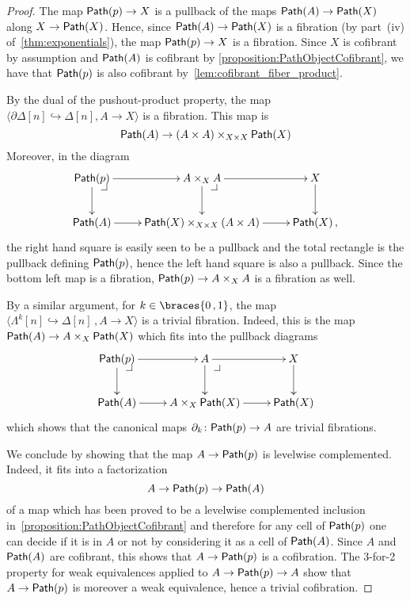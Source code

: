 \documentclass[reqno,10pt,a4paper,oneside,draft]{amsart}
\begin{document}
\begin{proof} The map $\mathsf{Path}(p) \rightarrow X$ is a pullback of the maps $\mathsf{Path}(A) \rightarrow \mathsf{Path}(X)$ along $X \rightarrow \mathsf{Path}(X)$. Hence, since $\mathsf{Path}(A) \rightarrow \mathsf{Path}(X)$ is a fibration (by part~(iv) of~\cref{thm:exponentials}), the map $\mathsf{Path}(p) \rightarrow X$ is a fibration. Since $X$ is cofibrant by assumption and $\mathsf{Path}(A)$ is  cofibrant by \cref{proposition:PathObjectCofibrant}, we have that $\mathsf{Path}(p)$ is also cofibrant by~\cref{lem:cofibrant_fiber_product}. 

By the dual of the pushout-product property, the map $\langle \partial \Delta[n] \hookrightarrow \Delta[n] ,  A \rightarrow X \rangle$ is a fibration. This map is 
\[ 
\mathsf{Path}(A) \rightarrow (A \times A) \times_{X \times X} \mathsf{Path}(X)
\] 
Moreover, in the diagram
\[
\xymatrix{
\Path(p) \drpullback \ar[r] \ar[d] & A \times_{X} A \ar[d] \ar[r] \drpullback & X \ar[d] \\
\Path(A) \ar[r] & \Path(X) \times_{X \times X}  (A \times A) \ar[r]  & \Path(X) \, ,
}
 \]
the right hand square is easily seen to be a pullback and the total rectangle is the pullback defining $\mathsf{Path}(p)$, hence the left hand square is also a pullback. Since the bottom left map is a fibration,  $\mathsf{Path}(p) \rightarrow A \times_{X} A$ is a fibration as well.

By a similar argument, for $k \in \braces{ 0 \, , 1}$, the map $\langle \Lambda^k[n] \hookrightarrow \Delta[n] \, , A \rightarrow X\rangle$ is a trivial fibration. Indeed, this is the map $\mathsf{Path}(A) \rightarrow  A  \times_X \mathsf{Path}(X)$ which fits into the pullback diagrams
\[
\xymatrix{
\Path(p) \drpullback \ar[r] \ar[d] & A  \ar[d] \ar[r] \drpullback & X \ar[d] \\
\Path(A) \ar[r] & A \times_X \Path(X) \ar[r]  & \Path(X)
}
 \]
which  shows that the canonical maps $\partial_k \colon \mathsf{Path}(p) \rightarrow A$ are trivial fibrations.

We conclude by showing that the map $A \rightarrow \mathsf{Path}(p)$ is levelwise complemented. Indeed, it fits into a factorization 
\[
A \rightarrow \mathsf{Path}(p) \rightarrow \mathsf{Path}(A)
\] 
of a map which has been proved to be a levelwise complemented inclusion in~\cref{proposition:PathObjectCofibrant} and therefore for any cell of $\mathsf{Path}(p)$ one can decide if it is in $A$ or not by considering it as a cell of $\mathsf{Path}(A)$. Since $A$ and $\mathsf{Path}(A)$ are cofibrant, this shows that $A \rightarrow \mathsf{Path}(p)$ is a cofibration. The 3-for-2 property for weak equivalences applied to $A \rightarrow \mathsf{Path}(p) \rightarrow A$ show that  $A \rightarrow \mathsf{Path}(p)$ is moreover a weak equivalence, hence a trivial cofibration.
\end{proof}
\end{document}
